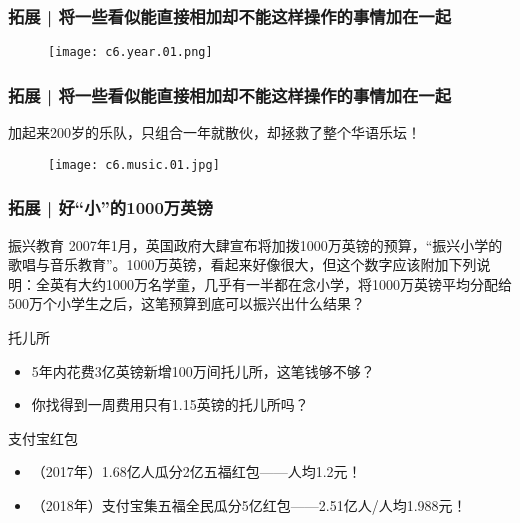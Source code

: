 \begin{frame}
  \frametitle{拓展 | 将一些看似能直接相加却不能这样操作的事情加在一起}
  \begin{figure}
    \centering
    \texttt{[image: c6.year.01.png]}
  \end{figure}
\end{frame}

\begin{frame}
  \frametitle{拓展 | 将一些看似能直接相加却不能这样操作的事情加在一起}
  加起来200岁的乐队，只组合一年就散伙，却拯救了整个华语乐坛！
  \vspace{-0.5em}
  \begin{figure}
    \centering
    \texttt{[image: c6.music.01.jpg]}
  \end{figure}
\end{frame}

\begin{frame}
  \frametitle{拓展 | 好“小”的1000万英镑}
  \begin{block}{振兴教育}
    2007年1月，英国政府大肆宣布将加拨1000万英镑的预算，“振兴小学的歌唱与音乐教育”。1000万英镑，看起来好像很大，但这个数字应该附加下列说明：全英有大约1000万名学童，几乎有一半都在念小学，将1000万英镑平均分配给500万个小学生之后，这笔预算到底可以振兴出什么结果？
  \end{block}
  \pause
  \begin{block}{托儿所}
    \begin{itemize}
      \item 5年内花费3亿英镑新增100万间托儿所，这笔钱够不够？
      \item 你找得到一周费用只有1.15英镑的托儿所吗？
    \end{itemize}
  \end{block}
  \pause
  \begin{block}{支付宝红包}
    \begin{itemize}
      \item （2017年）1.68亿人瓜分2亿五福红包——人均1.2元！
      \item （2018年）支付宝集五福全民瓜分5亿红包——2.51亿人/人均1.988元！
    \end{itemize}
  \end{block}
\end{frame}

